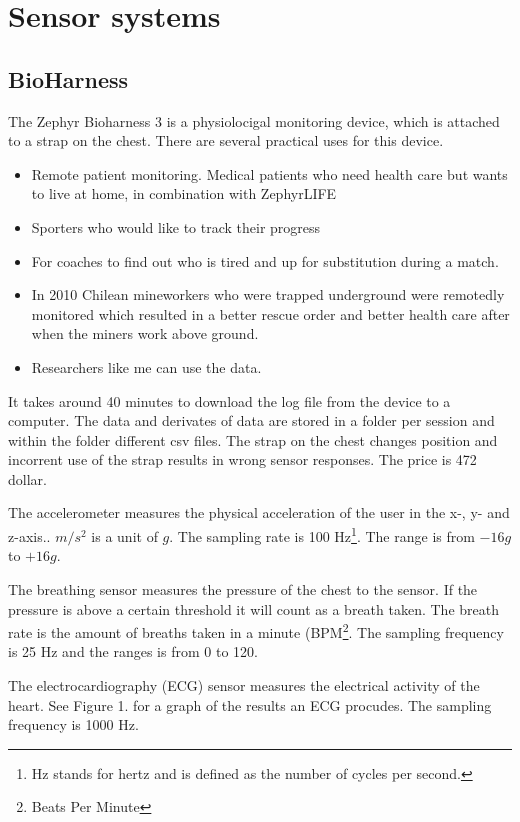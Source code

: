 \section{Sensor systems}
	\subsection{BioHarness}
			The Zephyr Bioharness 3 \cite{bioharness} is a physiolocigal monitoring device, which is attached to a strap on the chest. There are several practical uses for this device.
			\begin{itemize}
				\item Remote patient monitoring. Medical patients who need health care but wants to live at home, in combination with ZephyrLIFE \texttrademark \cite{bhpatients}
				\item Sporters who would like to track their progress 
				\item For coaches to find out who is tired and up for substitution during a match. \cite{bhsport}
				\item In 2010 Chilean mineworkers who were trapped underground were remotedly monitored which resulted in a better rescue order and better health care after when the miners work above ground. \cite{chile}
				\item Researchers like me can use the data.
			\end{itemize}
			It takes around 40 minutes to download the log file from the device to a computer. \cite{bhdatasheet} The data and derivates of data are stored in a folder per session and within the folder different csv files. The strap on the chest changes position and incorrent use of the strap results in wrong sensor responses.
			The price is 472 dollar.
		
			The accelerometer measures the physical acceleration of the user in the x-, y- and z-axis.. $m/s^2$ is a unit of $g$. The sampling rate is 100 Hz\footnote{Hz stands for hertz and is defined as the number of cycles per second.}. The range is from $-16g$ to $+16g$.

			The breathing sensor measures the pressure of the chest to the sensor. If the pressure is above a certain threshold it will count as a breath taken. The breath rate is the amount of breaths taken in a minute (BPM\footnote{Beats Per Minute}. The sampling frequency is 25 Hz and the ranges is from 0 to 120.

			The electrocardiography (ECG) sensor measures the electrical activity of the heart.\cite{ECG} See Figure 1. for a graph of the results an ECG procudes. The sampling frequency is 1000 Hz.

